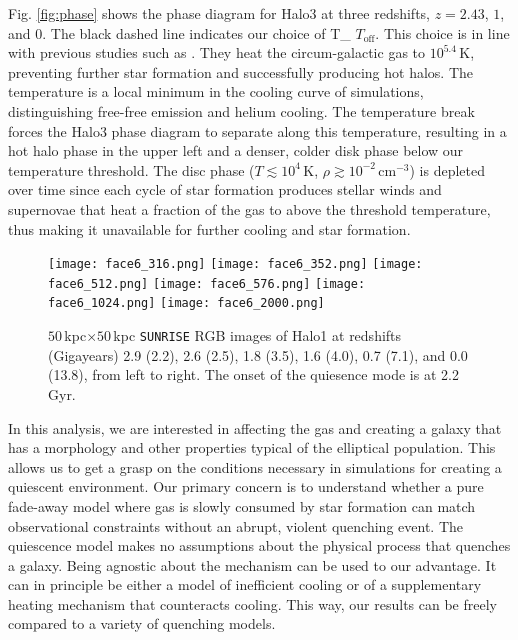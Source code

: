 \documentclass[useAMS,usenatbib]{mnras}
\newcommand{\Toff}	{\ifmmode T_{\mathrm{off}} \else $T_{\mathrm{off}}$\fi}
\begin{document}
% 
Fig. \ref{fig:phase} shows the phase diagram for Halo3 at three
redshifts, $z=2.43$, $1$, and $0$. The black dashed line indicates our
choice of \Toff. This choice is in line with previous studies
such as \citet{Gabor2015}. They heat the circum-galactic gas to
$10^{5.4}$\,K, preventing further star formation and successfully
producing hot halos. The temperature is a local minimum in the cooling
curve of simulations, distinguishing free-free emission and helium
cooling. The temperature break forces the Halo3 phase
diagram to separate along this temperature, resulting in a hot halo
phase in the upper left and a denser, colder disk phase below our
temperature threshold. The disc phase ($T\lesssim10^4$\,K,
$\rho\gtrsim10^{-2}$\,cm$^{-3}$) is depleted over time since each
cycle of star formation produces stellar winds and supernovae that
heat a fraction of the gas to above the threshold temperature, thus
making it unavailable for further cooling and star formation.

\newcommand{\mysize}{0.16}
\begin{figure*}
  \centering
 \texttt{[image: face6\_316.png]}
\texttt{[image: face6\_352.png]}
\texttt{[image: face6\_512.png]}
\texttt{[image: face6\_576.png]}
\texttt{[image: face6\_1024.png]}
\texttt{[image: face6\_2000.png]}
  \caption{$50\,$kpc$\times50\,$kpc \texttt{SUNRISE} RGB images of
    Halo1 at redshifts (Gigayears) 2.9 (2.2), 2.6 (2.5), 1.8 (3.5),
    1.6 (4.0), 0.7 (7.1), and 0.0 (13.8), from left to right. The
    onset of the quiesence mode is at 2.2\,Gyr.}
  \label{fig:sunrise}
\end{figure*}

In this analysis, we are interested in affecting the gas and creating
a galaxy that has a morphology and other {properties} typical of the
elliptical population. This allows us to get a grasp on the conditions
necessary in simulations for creating a quiescent environment.  Our
primary concern is to understand whether a pure fade-away model where
gas is slowly consumed by star formation can match observational
constraints without an abrupt, violent quenching event. {The
quiescence model makes no assumptions about the
physical process that quenches a galaxy. Being agnostic about the mechanism can be used to our
advantage.} It can in principle be either
a model of inefficient cooling or of a supplementary heating mechanism
that counteracts cooling. This way, our results can be freely compared
to a variety of quenching models.
%
%
%
\end{document}
